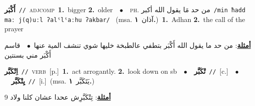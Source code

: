 \documentclass[10pt,a4paper,twoside]{article} %
\begin{document}
\begin{multicols}{2}
{\setlength\topsep{0pt}\textbf{\foreignlanguage{arabic}{أَكْبَر}}\ {\color{gray}\texttt{//}\color{black}}\ \textsc{adj\textunderscore comp}\ \textbf{1.}~bigger  \textbf{2.}~older\ \ $\bullet$\ \ \textsc{ph.} \color{gray} \foreignlanguage{arabic}{من حد مَا يقول الله أكبر}\color{black}\ {\color{gray}\texttt{/{\sffamily min ħadd maː j(q)uːl ʔalˤlˤaːhu ʔakbar}/}\color{black}}\ \color{gray} (msa. \foreignlanguage{arabic}{آذان}~\foreignlanguage{arabic}{\textbf{١.}})\color{black}\ \textbf{1.}~Adhan  \textbf{2.}~the call of the prayer\  \begin{flushright}\color{gray}\foreignlanguage{arabic}{\textbf{\underline{\foreignlanguage{arabic}{أمثلة}}}: من حد ما يقول الله أَكْبَر بتطفي عالطبخة خليها شوي تنشف المية عنها\ $\bullet$\ \  قاسم أَكْبَر مني بسنتين}\end{flushright}\color{black}} \vspace{2mm}

{\setlength\topsep{0pt}\textbf{\foreignlanguage{arabic}{اِتْكَبَّر}}\ {\color{gray}\texttt{//}\color{black}}\ \textsc{verb}\ [p.]\ \textbf{1.}~act arrogantly.  \textbf{2.}~look down on sb\ \ $\bullet$\ \ \setlength\topsep{0pt}\textbf{\foreignlanguage{arabic}{تْكَبَّر}}\ {\color{gray}\texttt{//}\color{black}}\ [c.]\ \ $\bullet$\ \ \setlength\topsep{0pt}\textbf{\foreignlanguage{arabic}{يِتْكَبَّر}}\ {\color{gray}\texttt{//}\color{black}}\ [i.]\ \color{gray}(msa. \foreignlanguage{arabic}{يَتَكَبَّر}~\foreignlanguage{arabic}{\textbf{١.}})\color{black}\  \begin{flushright}\color{gray}\foreignlanguage{arabic}{\textbf{\underline{\foreignlanguage{arabic}{أمثلة}}}: تِتْكَبَّرِش عحدا عشان كلنا ولاد 9}\end{flushright}\color{black}} \vspace{2mm}


\end{multicols}
\end{document}

